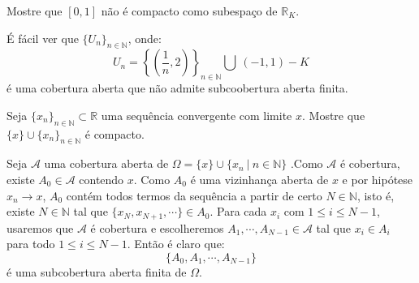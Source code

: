 \begin{Mybox}
Mostre que $[0, 1]$ não é compacto como subespaço de $\mathbb{R}_K. $
\vspace{-.4cm}
\end{Mybox}
\vspace{-.5cm}
\begin{dem}
É fácil ver que $\{U_n \}_{n \in \mathbb{N}}$, onde: $$U_n = \left\{\left(\dfrac{1}{n}, 2 \right) \right\}_{n \in \mathbb{N}} \bigcup \ (-1,1) - K$$ é uma cobertura aberta que não admite subcoobertura aberta finita.
\end{dem}

\begin{Mybox}
Seja $\{x_n \}_{n \in \mathbb{N}} \subset \mathbb{R}$ uma sequência convergente com limite $x$. Mostre que $\{ x\} \cup \{x_n \}_{n \in \mathbb{N}}$ é compacto. 
\vspace{-.4cm}
\end{Mybox}
\vspace{-.5cm}
\begin{dem}
Seja $\mathscr{A}$ uma cobertura aberta de $\Omega = \{x \} \cup \{x_n \ \vert \ n \in \mathbb{N} \}$ .Como $\mathscr{A}$ é cobertura, existe $A_0 \in \mathscr{A}$ contendo $x$. Como $A_0$ é uma vizinhança aberta de $x$ e por hipótese $x_n \to x$, $A_0$ contém todos termos da sequência a partir de certo $N \in \mathbb{N}$, isto é, existe $N \in \mathbb{N}$ tal que $\{x_N, x_{N+1}, \cdots \} \in A_0$. Para cada $x_i$ com $1 \leq i \leq N - 1$, usaremos que $\mathscr{A}$ é cobertura e escolheremos $A_1, \cdots, A_{N-1} \in \mathscr{A}$ tal que $x_i \in A_i$ para todo $1 \leq i \leq N - 1$. Então é claro que: $$\{A_0, A_1, \cdots, A_{N-1} \}$$ é uma subcobertura aberta finita de $\Omega$.
\end{dem}

